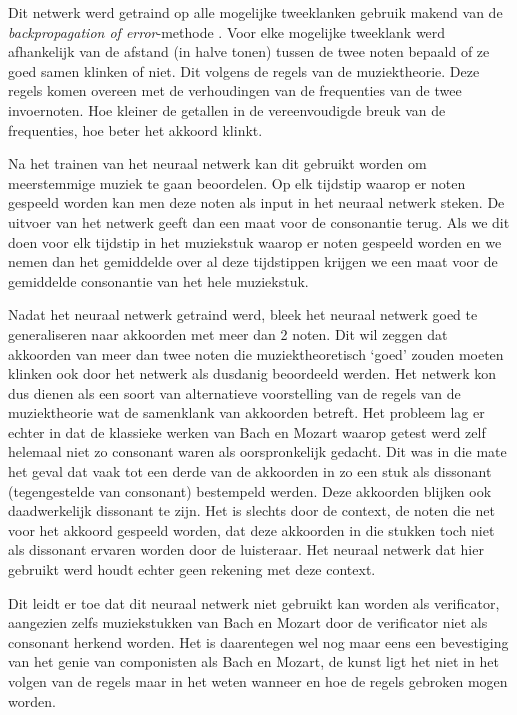 Dit netwerk werd getraind op alle mogelijke tweeklanken gebruik makend van de \textit{backpropagation of error}-methode \cite{url:backpropagation}. Voor elke mogelijke tweeklank werd afhankelijk van de afstand (in halve tonen) tussen de twee noten bepaald of ze goed samen klinken of niet. Dit volgens de regels van de muziektheorie. Deze regels komen overeen met de verhoudingen van de frequenties van de twee invoernoten. Hoe kleiner de getallen in de vereenvoudigde breuk van de frequenties, hoe beter het akkoord klinkt. 

Na het trainen van het neuraal netwerk kan dit gebruikt worden om meerstemmige muziek te gaan beoordelen. Op elk tijdstip waarop er noten gespeeld worden kan men deze noten als input in het neuraal netwerk steken. De uitvoer van het netwerk geeft dan een maat voor de consonantie terug. Als we dit doen voor elk tijdstip in het muziekstuk waarop er noten gespeeld worden en we nemen dan het gemiddelde over al deze tijdstippen krijgen we een maat voor de gemiddelde consonantie van het hele muziekstuk.

Nadat het neuraal netwerk getraind werd, bleek het neuraal netwerk goed te generaliseren naar akkoorden met meer dan 2 noten. Dit wil zeggen dat akkoorden van meer dan twee noten die muziektheoretisch `goed' zouden moeten klinken ook door het netwerk als dusdanig beoordeeld werden. Het netwerk kon dus dienen als een soort van alternatieve voorstelling van de regels van de muziektheorie wat de samenklank van akkoorden betreft. Het probleem lag er echter in dat de klassieke werken van Bach en Mozart waarop getest werd zelf helemaal niet zo consonant waren als oorspronkelijk gedacht. Dit was in die mate het geval dat vaak tot een derde van de akkoorden in zo een stuk als dissonant (tegengestelde van consonant) bestempeld werden. Deze akkoorden blijken ook daadwerkelijk dissonant te zijn. Het is slechts door de context, de noten die net voor het akkoord gespeeld worden, dat deze akkoorden in die stukken toch niet als dissonant ervaren worden door de luisteraar. Het neuraal netwerk dat hier gebruikt werd houdt echter geen rekening met deze context. 

Dit leidt er toe dat dit neuraal netwerk niet gebruikt kan worden als verificator, aangezien zelfs muziekstukken van Bach en Mozart door de verificator niet als consonant herkend worden. Het is daarentegen wel nog maar eens een bevestiging van het genie van componisten als Bach en Mozart, de kunst ligt het niet in het volgen van de regels maar in het weten wanneer en hoe de regels gebroken mogen worden.

